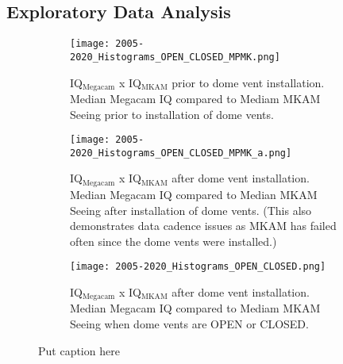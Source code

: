 \subsection{Exploratory Data Analysis}\label{sec:eda}

\begin{figure*}
\begin{subfigure}{0.33\textwidth}
\centering
    \texttt{[image: 2005-2020\_Histograms\_OPEN\_CLOSED\_MPMK.png]}
    \caption{IQ$_{\textrm{Megacam}}$ x IQ$_{\textrm{MKAM}}$ prior to dome vent installation. Median Megacam IQ compared to Mediam MKAM Seeing prior to installation of dome vents.}
    \label{fig:my_label}
\end{subfigure}
\begin{subfigure}{0.33\textwidth}
\centering
    \texttt{[image: 2005-2020\_Histograms\_OPEN\_CLOSED\_MPMK\_a.png]}
    \caption{IQ$_{\textrm{Megacam}}$ x IQ$_{\textrm{MKAM}}$ after dome vent installation. Median Megacam IQ compared to Median MKAM Seeing after installation of dome vents. (This also demonstrates data cadence issues as MKAM has failed often since the dome vents were installed.)}
    \label{fig:my_label}
\end{subfigure}
\begin{subfigure}{0.33\textwidth}
\centering
    \texttt{[image: 2005-2020\_Histograms\_OPEN\_CLOSED.png]}
    \caption{IQ$_{\textrm{Megacam}}$ x IQ$_{\textrm{MKAM}}$ after dome vent installation. Median Megacam IQ compared to Mediam MKAM Seeing when dome vents are OPEN or CLOSED.}
    \label{fig:my_label}
\end{subfigure}
\caption{Put caption here}
\label{fig:hists}
\end{figure*}


